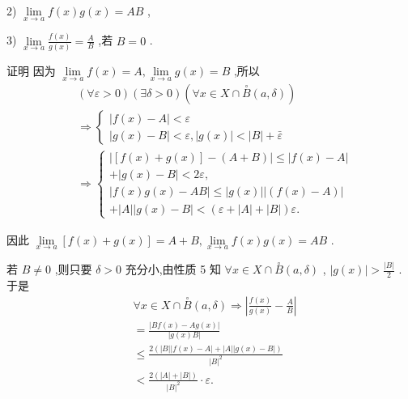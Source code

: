2) $\mathop{\lim }\limits_{{x \rightarrow  a}}f\left( x\right) g\left( x\right)  = {AB}$ ,

3) $\mathop{\lim }\limits_{{x \rightarrow  a}}\frac{f\left( x\right) }{g\left( x\right) } = \frac{A}{B}$ ,若 $B = 0$ .

证明 因为 $\mathop{\lim }\limits_{{x \rightarrow  a}}f\left( x\right)  = A,\mathop{\lim }\limits_{{x \rightarrow  a}}g\left( x\right)  = B$ ,所以
\begin{align*}
	&\left( {\forall \varepsilon  > 0}\right) \left( {\exists \delta  > 0}\right) \left( {\forall x \in  X \cap  \overset{ \circ  }{B}\left( {a,\delta }\right) }\right)\\
	&\Rightarrow  \left\{  \begin{array}{l} \left| {f\left( x\right)  - A}\right|  < \varepsilon \\  \left| {g\left( x\right)  - B}\right|  < \varepsilon ,\left| {g\left( x\right) }\right|  < \left| B\right|  + \bar{\varepsilon } \end{array}\right.\\
	&\Rightarrow  \left\{  \begin{array}{l} \left| {\left\lbrack  {f\left( x\right)  + g\left( x\right) }\right\rbrack   - \left( {A + B}\right) }\right|  \leq  \left| {f\left( x\right)  - A}\right| \\   + \left| {g\left( x\right)  - B}\right|  < {2\varepsilon }, \\  \left| {f\left( x\right) g\left( x\right)  - {AB}}\right|  \leq  \left| {g\left( x\right) }\right| \left| \left( {f\left( x\right)  - A}\right) \right| \\   + \left| A\right| \left| {g\left( x\right)  - B}\right|  < \left( {\varepsilon  + \left| A\right|  + \left| B\right| }\right) \varepsilon . \end{array}\right.
\end{align*}

因此 $\mathop{\lim }\limits_{{x \rightarrow  a}}\left\lbrack  {f\left( x\right)  + g\left( x\right) }\right\rbrack   = A + B,\mathop{\lim }\limits_{{x \rightarrow  a}}f\left( x\right) g\left( x\right)  = {AB}$ .

若 $B \neq  0$ ,则只要 $\delta  > 0$ 充分小,由性质 5 知 $\forall x \in  X \cap  \overset{ \circ  }{B}\left( {a,\delta }\right)$ , $\left| {g\left( x\right) }\right|  > \frac{\left| B\right| }{2}$ . 于是
\begin{align*}
	&\forall x \in  X \cap  \overset{ \circ  }{B}\left( {a,\delta }\right)  \Rightarrow  \left| {\frac{f\left( x\right) }{g\left( x\right) } - \frac{A}{B}}\right|\\
	&= \frac{\left| Bf\left( x\right)  - Ag\left( x\right) \right| }{\left| g\left( x\right) B\right| }\\
	&\leq  \frac{2\left( {\left| B\right| \left| {f\left( x\right)  - A}\right|  + \left| A\right| \left| {g\left( x\right)  - B}\right| }\right) }{{\left| B\right| }^{2}}\\
	&< \frac{2\left( {\left| A\right|  + \left| B\right| }\right) }{{\left| B\right| }^{2}} \cdot  \varepsilon .
\end{align*}

